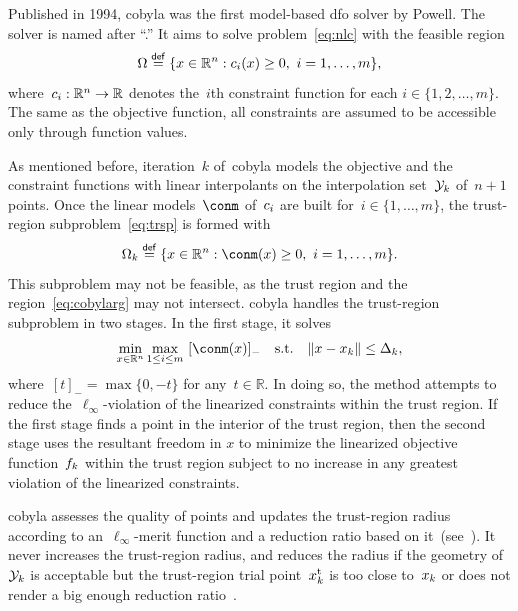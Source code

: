 \documentclass[
    smallextended,  %
    draft,          %
    final,          %
]{svjour3}
\newcommand{\R}{\mathbb{R}}
\newcommand{\con}[1][i]{c\ifthenelse{\equal{#1}{}}{}{_{#1}}}
\newcommand{\eqdef}{\mathrel{\stackrel{\mathsf{def}}{=}}}
\newcommand{\fsetm}[1][k]{\Omega_{#1}}
\newcommand{\fset}{\Omega}
\newcommand{\iter}[1][k]{x\ifthenelse{\equal{#1}{}}{}{_{#1}}}
\newcommand{\norm}[2][]{#1\lVert#2#1\rVert}
\newcommand{\objm}[1][k]{\obj\ifthenelse{\equal{#1}{}}{}{_{#1}}}
\newcommand{\obj}{f}
\newcommand{\rad}[1][k]{\Delta\ifthenelse{\equal{#1}{}}{}{_{#1}}}
\newcommand{\set}[2][]{#1\{#2#1\}}
\newcommand{\st}{\text{s.t.}}
\newcommand{\trust}{{\text{t}}}
\newcommand{\xpt}[1][k]{\mathcal{Y}\ifthenelse{\equal{#1}{}}{}{_{#1}}}
\begin{document}
Published in 1994, \gls{cobyla} was the first model-based \gls{dfo} solver by Powell.
The solver is named after ``.''
It aims to solve problem~\eqref{eq:nlc} with the feasible region
\begin{equation*}
    \fset \eqdef \set{x \in \R^n : \con(x) \ge 0, ~ i = 1, \dots, m},
\end{equation*}
where~$\con : \R^n \to \R$ denotes the~$i$th constraint function for each $i \in \set{1, 2, \dots, m}$.
The same as the objective function, all constraints are assumed to be accessible only through function values.

As mentioned before, iteration~$k$ of~\gls{cobyla} models the objective and the constraint functions with {linear}
interpolants on the interpolation set~$\xpt$ of~$n + 1$ points.
Once the linear models~$\conm$ of~$\con$ are built for~$i \in \set{1, \dots, m}$,
the trust-region subproblem~\eqref{eq:trsp} is formed with
\begin{equation}
    \label{eq:cobylarg}
    \fsetm \eqdef \set{x \in \R^n : \conm(x) \ge 0, ~ i=1, \dots, m}.
\end{equation}
This subproblem may not be feasible, as the trust region and the region~\eqref{eq:cobylarg} may not intersect.
\gls{cobyla} handles the trust-region subproblem in two stages.
In the first stage, it solves
\begin{equation*}
    \min_{x \in \R^n} \max_{1 \le i \le m} ~ [\conm(x)]_{-} \quad \st \quad \norm{x - \iter} \le
    \rad,
\end{equation*}
where~$[t]_{-} = \max \set{0, -t}$ for any~$t\in \R$.
In doing so, the method attempts to reduce the~$\ell_{\infty}$-violation of the linearized constraints within the trust region.
If the first stage finds a point in the interior of the trust region,
then the second stage uses the resultant freedom in $x$ to minimize the linearized objective
function~$\objm$ within the trust region subject to no increase in any greatest violation of the
linearized constraints.

\gls{cobyla} assesses the quality of points and updates the trust-region radius according to
an~$\ell_\infty$-merit function and a reduction ratio based on it~(see~\cite[equations~(5),~(9), and~(10)]{Powell_1994}).
It never increases
the trust-region radius, and reduces the radius if the geometry of~$\xpt$ is acceptable
but the trust-region trial point~$\iter^\trust$ is too close to~$\iter$ or does not render a big
enough reduction ratio~\mbox{\cite[equation~(11)]{Powell_1994}}.%
\end{document}
